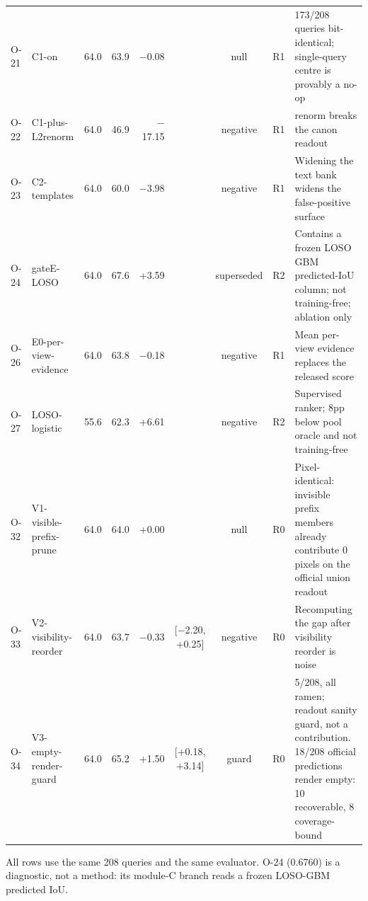 \begin{table}[t]
\begin{tabular}{llrrrcclp{5.2cm}}
O-21 & C1-on & 64.0 & 63.9 & $-$0.08 &  & null & R1 & 173/208 queries bit-identical; single-query centre is provably a no-op \\
O-22 & C1-plus-L2renorm & 64.0 & 46.9 & $-$17.15 &  & negative & R1 & renorm breaks the canon readout \\
O-23 & C2-templates & 64.0 & 60.0 & $-$3.98 &  & negative & R1 & Widening the text bank widens the false-positive surface \\
O-24 & gateE-LOSO & 64.0 & 67.6 & +3.59 &  & superseded & R2 & Contains a frozen LOSO GBM predicted-IoU column; not training-free; ablation only \\
O-26 & E0-per-view-evidence & 64.0 & 63.8 & $-$0.18 &  & negative & R1 & Mean per-view evidence replaces the released score \\
O-27 & LOSO-logistic & 55.6 & 62.3 & +6.61 &  & negative & R2 & Supervised ranker; 8pp below pool oracle and not training-free \\
O-32 & V1-visible-prefix-prune & 64.0 & 64.0 & +0.00 &  & null & R0 & Pixel-identical: invisible prefix members already contribute 0 pixels on the official union readout \\
O-33 & V2-visibility-reorder & 64.0 & 63.7 & $-$0.33 & [$-$2.20, +0.25] & negative & R0 & Recomputing the gap after visibility reorder is noise \\
O-34 & V3-empty-render-guard & 64.0 & 65.2 & +1.50 & [+0.18, +3.14] & guard & R0 & 5/208, all ramen; readout sanity guard, not a contribution. 18/208 official predictions render empty: 10 recoverable, 8 coverage-bound \\
\bottomrule
\end{tabular}
\par\smallskip\footnotesize All rows use the same 208 queries and the same evaluator. O-24 (0.6760) is a diagnostic, not a method: its module-C branch reads a frozen LOSO-GBM predicted IoU.
\end{table}
